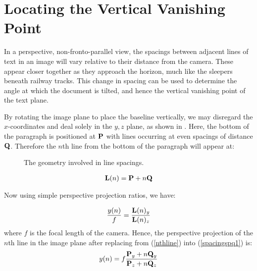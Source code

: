 
\section{Locating the Vertical Vanishing Point} \label{sec-vertvanish}


In a perspective, non-fronto-parallel view, the spacings between adjacent lines
of text in an image will vary relative to their distance from the camera.  These
appear closer together as they approach the horizon, much like the sleepers
beneath railway tracks. This change in spacing can be used to determine the angle
at which the document is tilted, and hence the vertical vanishing point of the
text plane.

By rotating the image plane to place the baseline vertically, we may disregard the $x$-coordinates and deal solely in the $y,z$ plane, as shown in .
Here, the bottom of the paragraph is positioned at ${ \bf P }$ with lines occurring at even spacings of distance ${ \bf Q }$.  Therefore the $n$th line from the bottom of the paragraph will appear at:

\begin{figure}[t]
\centering
\begin{center}
\caption{The geometry involved in line spacings.}
\label{zyspacings}
\end{center}
\end{figure}

\begin{eqnarray}
{ \bf L }(n) = { \bf P }+n{ \bf Q } \label{nthline}
\end{eqnarray}

{\parindent 0mm
Now using simple perspective projection ratios, we have: 
}

\begin{eqnarray}
\frac{y(n)}{f}  = \frac{ { \bf L }(n)_y }{ { \bf L }(n)_z }  \label{spacingspq1}
\end{eqnarray}
{\parindent 0mm
where $f$ is the focal length of the camera. Hence, the perspective projection
of the  $n$th line in the image plane after replacing from (\ref{nthline}) into
(\ref{spacingspq1}) is: 
}
\begin{eqnarray}
y(n) =  f \frac{ { \bf P }_y + n { \bf Q }_y }{ { \bf P }_z + n{ \bf Q }_z } \label{spacingspq}
\end{eqnarray}

